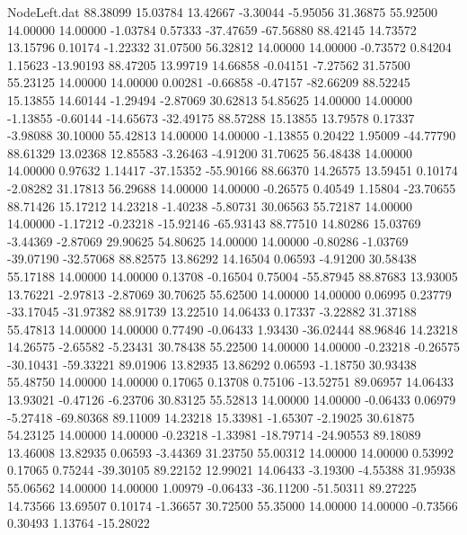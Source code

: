 \begin{filecontents}{NodeLeft.dat}
  88.38099   15.03784   13.42667    -3.30044   -5.95056   31.36875   55.92500   14.00000   14.00000   -1.03784    0.57333  -37.47659  -67.56880
  88.42145   14.73572   13.15796     0.10174   -1.22332   31.07500   56.32812   14.00000   14.00000   -0.73572    0.84204    1.15623  -13.90193
  88.47205   13.99719   14.66858    -0.04151   -7.27562   31.57500   55.23125   14.00000   14.00000    0.00281   -0.66858   -0.47157  -82.66209
  88.52245   15.13855   14.60144    -1.29494   -2.87069   30.62813   54.85625   14.00000   14.00000   -1.13855   -0.60144  -14.65673  -32.49175
  88.57288   15.13855   13.79578     0.17337   -3.98088   30.10000   55.42813   14.00000   14.00000   -1.13855    0.20422    1.95009  -44.77790
  88.61329   13.02368   12.85583    -3.26463   -4.91200   31.70625   56.48438   14.00000   14.00000    0.97632    1.14417  -37.15352  -55.90166
  88.66370   14.26575   13.59451     0.10174   -2.08282   31.17813   56.29688   14.00000   14.00000   -0.26575    0.40549    1.15804  -23.70655
  88.71426   15.17212   14.23218    -1.40238   -5.80731   30.06563   55.72187   14.00000   14.00000   -1.17212   -0.23218  -15.92146  -65.93143
  88.77510   14.80286   15.03769    -3.44369   -2.87069   29.90625   54.80625   14.00000   14.00000   -0.80286   -1.03769  -39.07190  -32.57068
  88.82575   13.86292   14.16504     0.06593   -4.91200   30.58438   55.17188   14.00000   14.00000    0.13708   -0.16504    0.75004  -55.87945
  88.87683   13.93005   13.76221    -2.97813   -2.87069   30.70625   55.62500   14.00000   14.00000    0.06995    0.23779  -33.17045  -31.97382
  88.91739   13.22510   14.06433     0.17337   -3.22882   31.37188   55.47813   14.00000   14.00000    0.77490   -0.06433    1.93430  -36.02444
  88.96846   14.23218   14.26575    -2.65582   -5.23431   30.78438   55.22500   14.00000   14.00000   -0.23218   -0.26575  -30.10431  -59.33221
  89.01906   13.82935   13.86292     0.06593   -1.18750   30.93438   55.48750   14.00000   14.00000    0.17065    0.13708    0.75106  -13.52751
  89.06957   14.06433   13.93021    -0.47126   -6.23706   30.83125   55.52813   14.00000   14.00000   -0.06433    0.06979   -5.27418  -69.80368
  89.11009   14.23218   15.33981    -1.65307   -2.19025   30.61875   54.23125   14.00000   14.00000   -0.23218   -1.33981  -18.79714  -24.90553
  89.18089   13.46008   13.82935     0.06593   -3.44369   31.23750   55.00312   14.00000   14.00000    0.53992    0.17065    0.75244  -39.30105
  89.22152   12.99021   14.06433    -3.19300   -4.55388   31.95938   55.06562   14.00000   14.00000    1.00979   -0.06433  -36.11200  -51.50311
  89.27225   14.73566   13.69507     0.10174   -1.36657   30.72500   55.35000   14.00000   14.00000   -0.73566    0.30493    1.13764  -15.28022

\end{filecontents}
